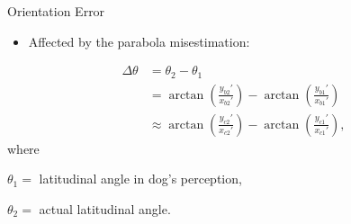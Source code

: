 \documentclass[compress,12pt,mp]{beamer}
\begin{document}
\begin{frame}{Orientation Error}
    \begin{itemize}
    \item Affected by the parabola misestimation:
    \end{itemize}
    \begin{align*}
        \Delta\theta &= \theta_2-\theta_1\\
        &= \arctan\left(\frac{y_{b2}'}{x_{b2}'}\right)-\arctan\left(\frac{y_{b1}'}{x_{b1}'}\right)\\
        &\approx \arctan\left(\frac{y_{c2}'}{x_{c2}'}\right)-\arctan\left(\frac{y_{c1}'}{x_{c1}'}\right),
    \end{align*}
    where 
    
    $\theta_1=$ latitudinal angle in dog's perception, 
    
    $\theta_2=$ actual latitudinal angle.
    \hfill
\end{frame}
%
\begin{comment}
\begin{frame}[t]{Orientation Error}
\begin{itemize}
\item Misestimation of orientation also effects how the dog will predict the parabola
\item Given an error in knowledge of eye orientation \(\Delta \theta\), the dog thinks the food will use the following equations to predict the trajectory once it breaks eye contact to open its mouth. 
\[x(t)=x_0+v_xt-\frac{1}{2}g\text{sin}(\Delta\theta)t^2\]
\[y(t)=y_0+v_yt-\frac{1}{2}g\text{cos}(\Delta\theta)t^2\]
\item as in the previous calculation, cos\(\Delta\theta\) is close to 1 until \(\Delta\theta\) is very large, so the effect of the change in \(y(t)\) can be safely ignored. Thus, the time it takes for the object to reach the elevation of the dog's mouth \(t_z\) can be assumed to be predicted correctly.
\end{itemize}
\end{frame}

\begin{frame}[t]{Orientation Error}
\begin{itemize}

\item So the only significant error introduced by this miscalculation by the dog's brain is the change in \(x(t)\). 
\item The error in predicted \(x\) position is given by:
\[\Delta x=-\frac{1}{2}g\text{sin}(\Delta \theta)t_z^2\]
\item As before, \(\Delta x\) has to be less than the difference between the mouth and object radii. 
\item Suppose \(r_m-r_p=1cm\) and \(t_z=0.2s\). Solving \(0.01\text{m}=-4.9\frac{\text{m}}{\text{s}^2}*(0.2\text{s})^2*\text{sin}(\Delta \theta)\) yields \(\Delta \theta=3\)  degrees. 
\item This is a fairly precise requirement, which means correctly estimating head orientation could be a source of considerable difficulty. 
\end{itemize}
\end{frame}
\end{comment}
\end{document}
